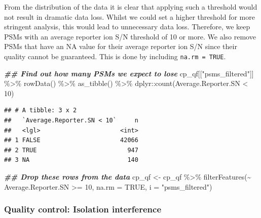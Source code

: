 \documentclass[9pt,a4paper,]{extarticle}
\newenvironment{Shaded}{\begin{snugshade}}{\end{snugshade}}
\newcommand{\AttributeTok}[1]{\textcolor[rgb]{0.77,0.63,0.00}{#1}}
\newcommand{\ConstantTok}[1]{\textcolor[rgb]{0.00,0.00,0.00}{#1}}
\newcommand{\DecValTok}[1]{\textcolor[rgb]{0.00,0.00,0.81}{#1}}
\newcommand{\DocumentationTok}[1]{\textcolor[rgb]{0.56,0.35,0.01}{\textbf{\textit{#1}}}}
\newcommand{\FunctionTok}[1]{\textcolor[rgb]{0.00,0.00,0.00}{#1}}
\newcommand{\NormalTok}[1]{#1}
\newcommand{\OtherTok}[1]{\textcolor[rgb]{0.56,0.35,0.01}{#1}}
\newcommand{\SpecialCharTok}[1]{\textcolor[rgb]{0.00,0.00,0.00}{#1}}
\newcommand{\StringTok}[1]{\textcolor[rgb]{0.31,0.60,0.02}{#1}}
\begin{document}
From the distribution of the data it is clear that applying such a threshold
would not result in dramatic data loss. Whilst we could set a higher threshold
for more stringent analysis, this would lead to unnecessary data loss.
Therefore, we keep PSMs with an average reporter ion S/N threshold of 10 or more.
We also remove PSMs that have an NA value for their average reporter ion
S/N since their quality cannot be guaranteed. This is done by including \texttt{na.rm\ =\ TRUE}.

\begin{Shaded}
\begin{Highlighting}[]
\DocumentationTok{\#\# Find out how many PSMs we expect to lose}
\NormalTok{cp\_qf[[}\StringTok{"psms\_filtered"}\NormalTok{]] }\SpecialCharTok{\%\textgreater{}\%} 
  \FunctionTok{rowData}\NormalTok{() }\SpecialCharTok{\%\textgreater{}\%} 
  \FunctionTok{as\_tibble}\NormalTok{() }\SpecialCharTok{\%\textgreater{}\%} 
\NormalTok{  dplyr}\SpecialCharTok{::}\FunctionTok{count}\NormalTok{(Average.Reporter.SN }\SpecialCharTok{\textless{}} \DecValTok{10}\NormalTok{)}
\end{Highlighting}
\end{Shaded}

\begin{verbatim}
## # A tibble: 3 x 2
##   `Average.Reporter.SN < 10`     n
##   <lgl>                      <int>
## 1 FALSE                      42066
## 2 TRUE                         947
## 3 NA                           140
\end{verbatim}

\begin{Shaded}
\begin{Highlighting}[]
\DocumentationTok{\#\# Drop these rows from the data}
\NormalTok{cp\_qf }\OtherTok{\textless{}{-}}\NormalTok{ cp\_qf }\SpecialCharTok{\%\textgreater{}\%}
  \FunctionTok{filterFeatures}\NormalTok{(}\SpecialCharTok{\textasciitilde{}}\NormalTok{ Average.Reporter.SN }\SpecialCharTok{\textgreater{}=} \DecValTok{10}\NormalTok{, }
                 \AttributeTok{na.rm =} \ConstantTok{TRUE}\NormalTok{,}
                 \AttributeTok{i =} \StringTok{"psms\_filtered"}\NormalTok{)}
\end{Highlighting}
\end{Shaded}

\hypertarget{quality-control-isolation-interference}{%
\subsubsection{Quality control: Isolation interference}\label{quality-control-isolation-interference}}
\end{document}
